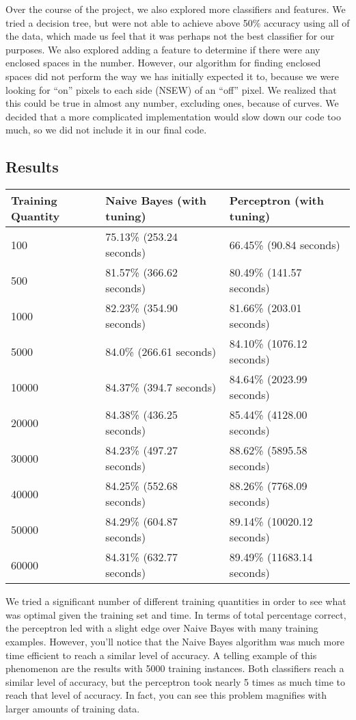 \documentclass{article}
\theoremstyle{remark}
\begin{document}
	Over the course of the project, we also explored more classifiers and features. We tried a decision tree, but were not able to achieve above 50\% accuracy using all of the data, which made us feel that it was perhaps not the best classifier for our purposes. We also explored adding a feature to determine if there were any enclosed spaces in the number. However, our algorithm for finding enclosed spaces did not perform the way we has initially expected it to, because we were looking for ``on'' pixels to each side (NSEW) of an ``off'' pixel. We realized that this could be true in almost any number, excluding ones, because of curves. We decided that a more complicated implementation would slow down our code too much, so we did not include it in our final code.
     \subsection*{Results}
     \begin{table}[h!]
        \centering
        \begin{tabular}{l|l|l}
        Training Quantity & Naive Bayes (with tuning) & Perceptron (with tuning)   \\ \hline
        100               & 75.13\% (253.24 seconds)  & 66.45\% (90.84 seconds)    \\
        500               & 81.57\% (366.62 seconds)  & 80.49\% (141.57 seconds)   \\
        1000              & 82.23\% (354.90 seconds)  & 81.66\% (203.01 seconds)   \\
        5000              & 84.0\% (266.61 seconds)   & 84.10\% (1076.12 seconds)  \\
        10000             & 84.37\% (394.7 seconds)   & 84.64\% (2023.99 seconds)  \\
        20000             & 84.38\% (436.25 seconds)  & 85.44\% (4128.00 seconds)  \\
        30000             & 84.23\% (497.27 seconds)  & 88.62\% (5895.58 seconds)  \\
        40000             & 84.25\% (552.68 seconds)  & 88.26\% (7768.09 seconds)  \\
        50000             & 84.29\% (604.87 seconds)  & 89.14\% (10020.12 seconds) \\
        60000             & 84.31\% (632.77 seconds)  & 89.49\% (11683.14 seconds) \\
        \end{tabular}
     \end{table}
     We tried a significant number of different training quantities in order to see what was optimal given the training set and time. In terms of total percentage correct, the perceptron led with a slight edge over Naive Bayes with many training examples. However, you'll notice that the Naive Bayes algorithm was much more time efficient to reach a similar level of accuracy. A telling example of this phenomenon are the results with 5000 training instances. Both classifiers reach a similar level of accuracy, but the perceptron took nearly 5 times as much time to reach that level of accuracy. In fact, you can see this problem magnifies with larger amounts of training data.
\end{document}
